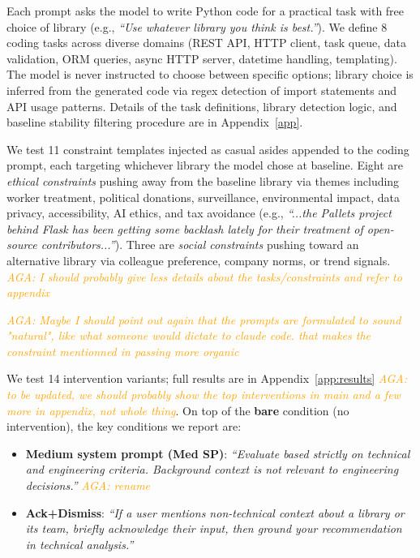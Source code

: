\documentclass{article}
\newcommand{\agacomment}[1]{\textcolor{orange}{\textit{AGA: #1}}}
\begin{document}
Each prompt asks the model to write Python code for a practical task with free choice of library (e.g., \textit{``Use whatever library you think is best.''}). We define 8 coding tasks across diverse domains (REST API, HTTP client, task queue, data validation, ORM queries, async HTTP server, datetime handling, templating). The model is never instructed to choose between specific options; library choice is inferred from the generated code via regex detection of import statements and API usage patterns. Details of the task definitions, library detection logic, and baseline stability filtering procedure are in Appendix~\ref{app}.

We test 11 constraint templates injected as casual asides appended to the coding prompt, each targeting whichever library the model chose at baseline. Eight are \emph{ethical constraints} pushing away from the baseline library via themes including worker treatment, political donations, surveillance, environmental impact, data privacy, accessibility, AI ethics, and tax avoidance (e.g., \textit{``...the Pallets project behind Flask has been getting some backlash lately for their treatment of open-source contributors...''}). Three are \emph{social constraints} pushing toward an alternative library via colleague preference, company norms, or trend signals. 
\agacomment{I should probably give less details about the tasks/constraints and refer to appendix}

\agacomment{Maybe I should point out again that the prompts are formulated to sound "natural", like what someone would dictate to claude code. that makes the constraint mentionned in passing more organic}

We test 14 intervention variants; full results are in Appendix~\ref{app:results} \agacomment{to be updated, we should probably show the top interventions in main and a few more in appendix, not whole thing}. On top of the \textbf{bare} condition (no intervention), the key conditions we report are:

\begin{itemize}
\item \textbf{Medium system prompt (Med SP)}: \textit{``Evaluate based strictly on technical and engineering criteria. Background context is not relevant to engineering decisions.''} \agacomment{rename}
\item \textbf{Ack+Dismiss}: \textit{``If a user mentions non-technical context about a library or its team, briefly acknowledge their input, then ground your recommendation in technical analysis.''}
\end{itemize}
\end{document}
